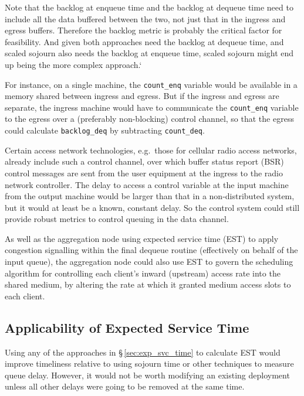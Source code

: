 Note that the backlog at enqueue time and the backlog at dequeue time need to include all the data buffered between the two, not just that in the ingress and egress buffers. Therefore the backlog metric is probably the critical factor for feasibility. And given both approaches need the backlog at dequeue time, and scaled sojourn also needs the backlog at enqueue time, scaled sojourn might end up being the more complex approach.`

For instance, on a single machine, the \texttt{count\_enq} variable would be available in a memory shared between ingress and egress. But if the ingress and egress are separate, the ingress machine would have to communicate the \texttt{count\_enq} variable to the egress over a (preferably non-blocking) control channel, so that the egress could calculate \texttt{backlog\_deq} by subtracting \texttt{count\_deq}. 

Certain access network technologies, e.g.\ those for cellular radio access networks, already include such a control channel, over which buffer status report (BSR) control messages are sent from the user equipment at the ingress to the radio network controller. The delay to access a control variable at the input machine from the output machine would be larger than that in a non-distributed system, but it would at least be a known, constant delay. So the control system could still provide robust metrics to control queuing in the data channel.

As well as the aggregation node using expected service time (EST) to apply congestion signalling within the final dequeue routine (effectively on behalf of the input queue), the aggregation node could also use EST to govern the scheduling algorithm for controlling each client's inward (upstream) access rate into the shared medium, by altering the rate at which it granted medium access slots to each client.

\subsection{Applicability of Expected Service Time}\label{sec:inst_svc_time_applic}

Using any of the approaches in \S\,\ref{sec:exp_svc_time} to calculate EST would improve timeliness relative to using sojourn time or other techniques to measure queue delay. However, it would not be worth modifying an existing deployment unless all other delays were going to be removed at the same time. 

